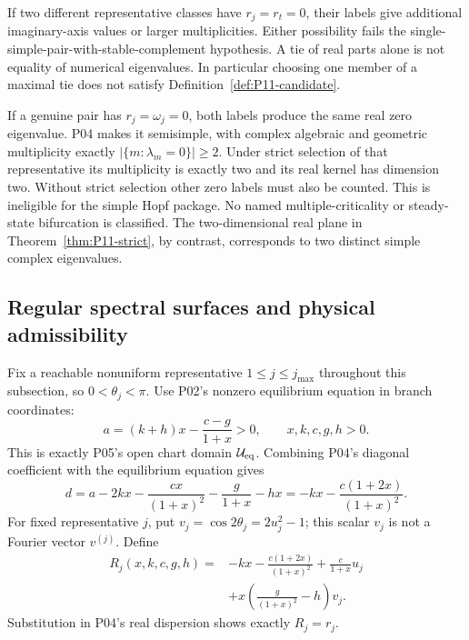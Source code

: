 \begin{remark}
\label{rem:P11-degeneracies}
If two different representative classes have $r_j=r_t=0$, their
labels give additional imaginary-axis values or larger multiplicities.
Either possibility fails the single-simple-pair-with-stable-complement
hypothesis. A tie of real parts alone is not equality of numerical
eigenvalues. In particular choosing one member of a maximal tie does
not satisfy Definition~\ref{def:P11-candidate}.

If a genuine pair has $r_j=\omega_j=0$, both labels produce the
same real zero eigenvalue. P04 makes it semisimple, with complex
algebraic and geometric multiplicity exactly
$|\{m:\lambda_m=0\}|\ge2$. Under strict selection of that
representative its multiplicity is exactly two and its real kernel
has dimension two. Without strict selection other zero labels must
also be counted. This is ineligible for the simple Hopf package.
No named multiple-criticality or steady-state bifurcation is classified.
The two-dimensional real plane in Theorem~\ref{thm:P11-strict}, by
contrast, corresponds to two distinct simple complex eigenvalues.
\end{remark}

\subsection{Regular spectral surfaces and physical admissibility}
Fix a reachable nonuniform representative $1\le j\le j_{\max}$
throughout this subsection, so $0<\theta_j<\pi$.
Use P02's nonzero equilibrium equation in branch coordinates:
\begin{equation}
 a=(k+h)x-\frac{c-g}{1+x}>0,\qquad x,k,c,g,h>0.
 \label{eq:P11-chart}
\end{equation}
This is exactly P05's open chart domain $\mathcal U_{\rm eq}$.
Combining P04's diagonal coefficient with the equilibrium equation gives
\[
 d=a-2kx-\frac{cx}{(1+x)^2}-\frac g{1+x}-hx
   =-kx-\frac{c(1+2x)}{(1+x)^2}.
\]
For fixed representative $j$, put $v_j=\cos2\theta_j=2u_j^2-1$;
this scalar $v_j$ is not a Fourier vector $v^{(j)}$. Define
\begin{equation}
 \begin{split}
 R_j(x,k,c,g,h)={}&-kx-\frac{c(1+2x)}{(1+x)^2}
                 +\frac{c}{1+x}u_j\\
                &+x\left(\frac{g}{(1+x)^2}-h\right)v_j.
 \end{split}
 \label{eq:P11-R}
\end{equation}
Substitution in P04's real dispersion shows exactly $R_j=r_j$.


